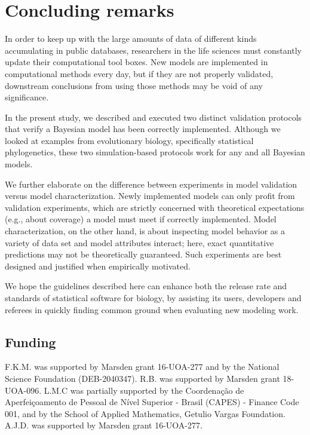 \documentclass[oneside]{article}
\begin{document}
\section*{Concluding remarks}

In order to keep up with the large amounts of data of different kinds accumulating in public databases, researchers in the life sciences must constantly update their computational tool boxes.
New models are implemented in computational methods every day, but if they are not properly validated, downstream conclusions from using those methods may be void of any significance.

In the present study, we described and executed two distinct validation protocols that verify a Bayesian model has been correctly implemented.
Although we looked at examples from evolutionary biology, specifically statistical phylogenetics, these two simulation-based protocols work for any and all Bayesian models.

We further elaborate on the difference between experiments in model validation versus model characterization.
Newly implemented models can only profit from validation experiments, which are strictly concerned with theoretical expectations (e.g., about coverage) a model must meet if correctly implemented.
Model characterization, on the other hand, is about inspecting model behavior as a variety of data set and model attributes interact; here, exact quantitative predictions may not be theoretically guaranteed.
Such experiments are best designed and justified when empirically motivated.

We hope the guidelines described here can enhance both the release rate and standards of statistical software for biology, by assisting its users, developers and referees in quickly finding common ground when evaluating new modeling work.


\subsection*{Funding}
F.K.M. was supported by Marsden grant 16-UOA-277 and by the National Science Foundation (DEB-2040347).
R.B. was supported by Marsden grant 18-UOA-096.
L.M.C was partially supported by the Coordenação de Aperfeiçoamento de
Pessoal de Nível Superior - Brasil (CAPES) - Finance Code 001, and by the School of Applied Mathematics,  Getulio Vargas Foundation.
A.J.D. was supported by Marsden grant 16-UOA-277.






\end{document}
